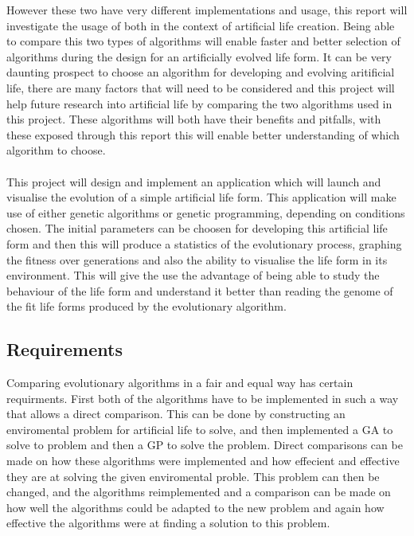 \documentclass[12pt]{article}
\begin{document}
However these two have very different implementations and usage, this report will investigate the usage of both in the context of artificial life creation. 
Being able to compare this two types of algorithms will enable faster and better selection of algorithms during 
the design for an artificially evolved life form. It can be very daunting prospect to choose an algorithm
for developing and evolving aritificial life, there are many factors that will need to be considered and this
project will help future research into artificial life by comparing the two algorithms used in this project.
These algorithms will both have their benefits and pitfalls, with these exposed through this report this 
will enable better understanding of which algorithm to choose.


\paragraph{}
This project will design and implement an application which will launch and visualise the evolution of a
simple artificial life form. This application will make use of either genetic algorithms or genetic programming,
depending on conditions chosen. The initial parameters can be choosen for developing this artificial life form
and then this will produce a statistics of the evolutionary process, graphing the fitness over generations
and also the ability to visualise the life form in its environment. This will give the use the advantage of being
able to study the behaviour of the life form and understand it better than reading the genome of the fit life forms
produced by the evolutionary algorithm.


\paragraph{}

\subsection{Requirements}
Comparing evolutionary algorithms in a fair and equal way has certain requirments. First both of the algorithms have to be implemented in such a way that allows a direct comparison. 
This can be done by constructing an enviromental problem for artificial life to solve, and then implemented a GA to solve to problem and then a GP to solve the problem. Direct
comparisons can be made on how these algorithms were implemented and how effecient and effective they are at solving the given enviromental proble. This problem can then be changed, 
and the algorithms reimplemented and a comparison can be made on how well the algorithms could be adapted to the new problem and again how effective the algorithms were at
finding a solution to this problem.
\end{document}
